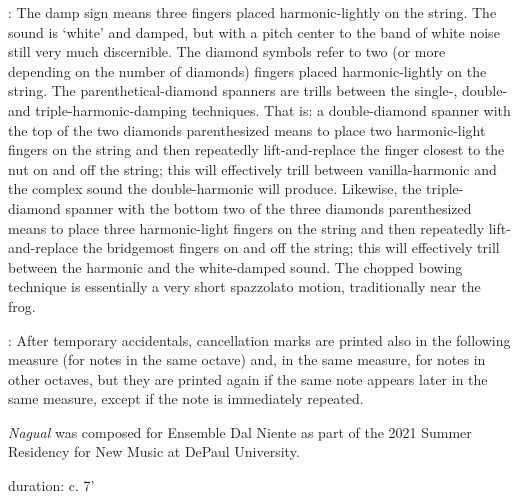 \documentclass[11pt]{article}
\newcommand*\circled[1]{\tikz[baseline=(char.base)]{
            \node[shape=circle,draw,inner sep=1pt] (char) {#1};}}
\begin{document}
\begin{center}
 : \circled{1} The damp sign means three fingers placed harmonic-lightly on the string. The sound is `white' and damped, but with a pitch center to the band of white noise still very much discernible. \circled{2} The diamond symbols refer to two (or more depending on the number of diamonds) fingers placed harmonic-lightly on the string. \circled{3} The parenthetical-diamond spanners are trills between the single-, double- and triple-harmonic-damping techniques. That is: a double-diamond spanner with the top of the two diamonds parenthesized means to place two harmonic-light fingers on the string and then repeatedly lift-and-replace the finger closest to the nut on and off the string; this will effectively trill between vanilla-harmonic and the complex sound the double-harmonic will produce. Likewise, the triple-diamond spanner with the bottom two of the three diamonds parenthesized means to place three harmonic-light fingers on the string and then repeatedly lift-and-replace the bridgemost fingers on and off the string; this will effectively trill between the harmonic and the white-damped sound. \circled{4} The chopped bowing technique is essentially a very short spazzolato motion, traditionally near the frog.
\rightskip\leftskip
\phantom{text} \hfill \phantom{()}

 : After temporary accidentals, cancellation marks are printed also in the following measure (for notes in the same octave) and, in the same measure, for notes in other octaves, but they are printed again if the same note appears later in the same measure, except if the note is immediately repeated.
\rightskip\leftskip
\phantom{text} \hfill \phantom{()}
\end{center}
\endgroup

\vspace*{9\baselineskip}

\begin{center}
\textit{Nagual} was composed for Ensemble Dal Niente as part of the 2021 Summer Residency for New Music at DePaul University.
\rightskip\leftskip
\phantom{text} \hfill \phantom{()}
\end{center}

\vspace*{26\baselineskip}

\begin{center}
duration: c. 7'
\end{center}
\end{document}

